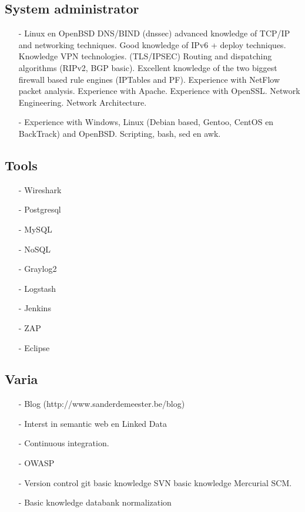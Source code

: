 \documentclass[margin, 10pt]{res} %
\begin{document}
\subsection{System administrator}
\begin{itemize}
\item[-] Linux en OpenBSD
\subitem DNS/BIND (dnssec)
\subitem advanced knowledge of TCP/IP and networking techniques.
\subitem Good knowledge of IPv6 + deploy techniques.
\subitem Knowledge VPN technologies. (TLS/IPSEC)
\subitem Routing and dispatching algorithms (RIPv2, BGP basic).
\subitem Excellent knowledge of the two biggest firewall based rule engines (IPTables and PF).
\subitem Experience with NetFlow packet analysis.
\subitem Experience with Apache.
\subitem Experience with OpenSSL.
\subitem Network Engineering.
\subitem Network Architecture.
\item[-] Experience with Windows, Linux (Debian based, Gentoo, CentOS en BackTrack) and OpenBSD.
\subitem Scripting, bash, sed en awk.
\end{itemize}
\begin{multicols}{2}
\subsection*{Tools}
\begin{enumerate}
\item[-] Wireshark
\item[-] Postgresql
\item[-] MySQL
\item[-] NoSQL
\item[-] Graylog2
\item[-] Logstash
\item[-] Jenkins
\item[-] ZAP
\item[-] Eclipse
\end{enumerate}
\end{multicols}
\subsection{Varia}
\begin{enumerate}
\item[-] Blog (http://www.sanderdemeester.be/blog)
\item[-] Interst in semantic web en Linked Data
\item[-] Continuous integration.
\item[-] OWASP
\item[-] Version control
\subitem git
\subitem basic knowledge SVN
\subitem basic knowledge Mercurial SCM.
\item[-] Basic knowledge databank normalization
\end{enumerate}
\end{document}

